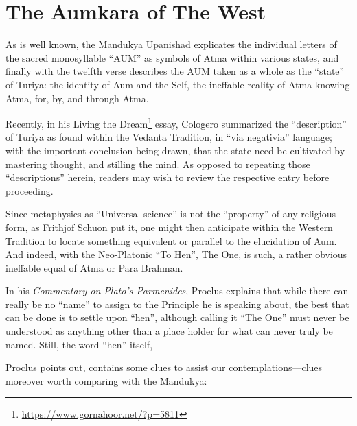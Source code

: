 \section{The Aumkara of The West}

As is well known, the Mandukya Upanishad explicates the individual letters of the sacred monosyllable ``AUM'' as symbols of Atma within various states, and finally with the twelfth verse describes the AUM taken as a whole as the ``state'' of Turiya: the identity of Aum and the Self, the ineffable reality of Atma knowing Atma, for, by, and through Atma.

Recently, in his Living the Dream\footnote{\url{https://www.gornahoor.net/?p=5811}} essay, Cologero summarized the ``description'' of Turiya as found within the Vedanta Tradition, in ``via negativia'' language; with the important conclusion being drawn, that the state need be cultivated by mastering thought, and stilling the mind. As opposed to repeating those ``descriptions'' herein, readers may wish to review the respective entry before proceeding.

Since metaphysics as ``Universal science'' is not the ``property'' of any religious form, as Frithjof Schuon put it, one might then anticipate within the Western Tradition to locate something equivalent or parallel to the elucidation of Aum. And indeed, with the Neo-Platonic ``To Hen'', The One, is such, a rather obvious ineffable equal of Atma or Para Brahman.

In his \textit{Commentary on Plato's Parmenides}, Proclus explains that while there can really be no ``name'' to assign to the Principle he is speaking about, the best that can be done is to settle upon ``hen'', although calling it ``The One'' must never be understood as anything other than a place holder for what can never truly be named. Still, the word ``hen'' itself,

Proclus points out, contains some clues to assist our contemplations---clues moreover worth comparing with the Mandukya:

